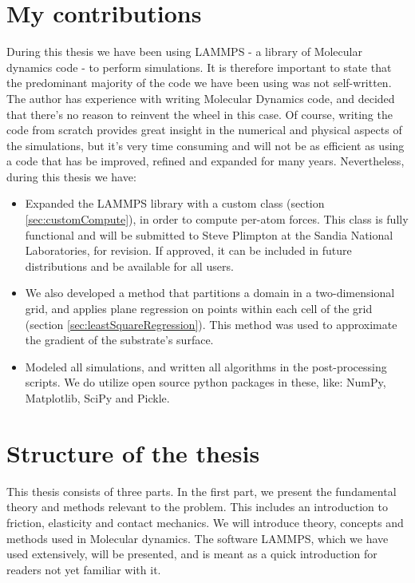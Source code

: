 \documentclass[twoside,english]{uiofysmaster}
\begin{document}
\section{My contributions}
During this thesis we have been using LAMMPS - a library of Molecular dynamics code - to perform simulations. 
It is therefore important to state that the predominant majority of the code we have been using was not self-written.
The author has experience with writing Molecular Dynamics code, and decided that there's no reason to reinvent the wheel in this case. 
Of course, writing the code from scratch provides great insight in the numerical and physical aspects of the simulations, but it's very time consuming and will not be as efficient as using a code that has be improved, refined and expanded for many years.
Nevertheless, during this thesis we have:	
\begin{itemize}
\item Expanded the LAMMPS library with a custom class (section \ref{sec:customCompute}), in order to compute per-atom forces. 
This class is fully functional and will be submitted to Steve Plimpton at the Sandia National Laboratories, for revision. 
If approved, it can be included in future distributions and be available for all users. 

\item We also developed a method that partitions a domain in a two-dimensional grid, and applies plane regression on points within each cell of the grid (section \ref{sec:leastSquareRegression}).  
This method was used to approximate the gradient of the substrate's surface.

\item Modeled all simulations, and written all algorithms in the post-processing scripts. We do utilize open source python packages in these, like: NumPy, Matplotlib, SciPy and Pickle.

\end{itemize}

\section{Structure of the thesis}
This thesis consists of three parts. 
In the first part, we present the fundamental theory and methods relevant to the problem. 
This includes an introduction to friction, elasticity and contact mechanics.
We will introduce theory, concepts and methods used in Molecular dynamics. 
The software LAMMPS, which we have used extensively, will be presented, and is meant as a quick introduction for readers not yet familiar with it. 
\end{document}
